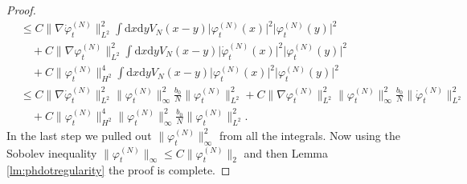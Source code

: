 \documentclass[11pt,a4paper,draft,DIV11]{scrartcl}	%
\newcommand{\di}{\textrm{d}}		%
\newcommand{\norm}[1]{\lVert#1\rVert}	%
\newcommand{\ph}{\varphi_t^{(N)}}	%
\newcommand{\phdot}{\dot{\varphi}_t^{(N)}}	%
\begin{document}
\begin{proof}
\begin{align*}
& \leq C \norm{\nabla \phdot}_{L^2}^2 \int \di x \di y V_N(x-y) \lvert \ph(x)\rvert^2 \lvert \ph(y)\rvert^2 \\
& \quad + C \norm{\nabla \ph}_{L^2}^2 \int \di x \di y V_N(x-y) \lvert \phdot(x)\rvert^2 \lvert \ph(y)\rvert^2 \\
& \quad + C \norm{\ph}_{H^2}^4 \int \di x \di y V_N(x-y) \lvert \ph(x)\rvert^2 \lvert \ph(y)\rvert^2 \\
& \leq C \norm{\nabla \phdot}_{L^2}^2 \norm{\ph}_\infty^2 \frac{b_0}{N} \norm{\ph}_{L^2}^2 + C \norm{\nabla \ph}_{L^2}^2 \norm{\ph}_\infty^2 \frac{b_0}{N} \norm{\phdot}_{L^2}^2\\
& \quad + C \norm{\ph}_{H^2}^4 \norm{\ph}_\infty^2 \frac{b_0}{N} \norm{\ph}_{L^2}^2.
\end{align*}
In the last step we pulled out $\norm{\ph}_\infty^2$ from all the integrals. Now using the Sobolev inequality $\norm{\ph}_\infty \leq C \norm{\ph}_2$ and then Lemma \ref{lm:phdotregularity} the proof is complete.
\end{proof}
\end{document}
